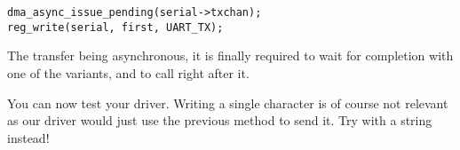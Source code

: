 \begin{verbatim}
dma_async_issue_pending(serial->txchan);
reg_write(serial, first, UART_TX);
\end{verbatim}

The transfer being asynchronous, it is finally required to wait for completion
with one of the  variants, and to call
 right after it.

You can now test your driver. Writing a single character is of course not
relevant as our driver would just use the previous method to send it. Try with
a string instead!
